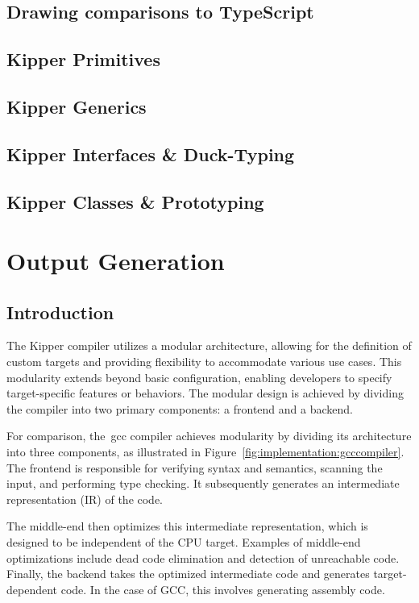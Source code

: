 \subsection{Drawing comparisons to TypeScript}

\subsection{Kipper Primitives}

\subsection{Kipper Generics}

\subsection{Kipper Interfaces \& Duck-Typing}

\subsection{Kipper Classes \& Prototyping}

\section{Output Generation}
\label{sec:output-generation}

\subsection{Introduction}

The Kipper compiler utilizes a modular architecture, allowing for the definition of custom targets and providing flexibility to accommodate various use cases. This modularity extends beyond basic configuration, enabling developers to specify target-specific features or behaviors. The modular design is achieved by dividing the compiler into two primary components: a frontend and a backend.

For comparison, the~\acrshort{gcc} compiler achieves modularity by dividing its architecture into three components, as illustrated in Figure~\ref{fig:implementation:gcccompiler}. The frontend is responsible for verifying syntax and semantics, scanning the input, and performing type checking. It subsequently generates an intermediate representation (IR) of the code.

The middle-end then optimizes this intermediate representation, which is designed to be independent of the CPU target. Examples of middle-end optimizations include dead code elimination and detection of unreachable code. Finally, the backend takes the optimized intermediate code and generates target-dependent code. In the case of GCC, this involves generating assembly code.

